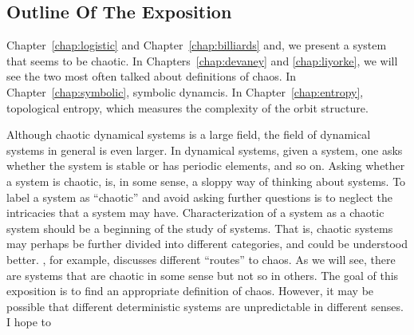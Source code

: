 \documentclass[10pt,twoside,draft]{book}
\begin{document}
\subsection*{Outline Of The Exposition}
Chapter~\ref{chap:logistic} and Chapter~\ref{chap:billiards} and, we present a system that seems to be chaotic.
In Chapters~\ref{chap:devaney} and \ref{chap:liyorke}, we will see the two most often talked about definitions of chaos.
In Chapter~\ref{chap:symbolic}, symbolic dynamcis.
In Chapter~\ref{chap:entropy}, topological entropy, which measures the complexity of the orbit structure.

Although chaotic dynamical systems is a large field, the field of dynamical systems in general is even larger.
In dynamical systems, given a system, one asks whether the system is stable or has periodic elements, and so on.
Asking whether a system is chaotic, is, in some sense, a sloppy way of thinking about systems.
To label a system as ``chaotic'' and avoid asking further questions is to neglect the intricacies that a system may have.
Characterization of a system as a chaotic system should be a beginning of the study of systems.
That is, chaotic systems may perhaps be further divided into different categories, and could be understood better.
\citet{devaney}, for example, discusses different ``routes'' to chaos.
As we will see, there are systems that are chaotic in some sense but not so in others.
The goal of this exposition is to find an appropriate definition of chaos.
However, it may be possible that different deterministic systems are unpredictable in different senses.
I hope to 



\end{document}
